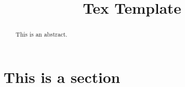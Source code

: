 \documentclass[draftclsnofoot,onecolumn,journal,letterpaper,10pt]{IEEEtran}
\title{Tex Template}
\author{\names}
\begin{document}
\begin{titlepage}
  \clearpage
  \maketitle
  \thispagestyle{empty}
    \begin{abstract}
      This is an abstract.
    \end{abstract}
\end{titlepage}

\section{This is a section}
  
\nocite{*} %


\end{document}
